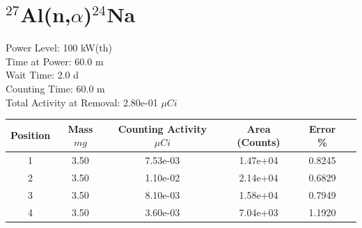 \newpage

\section*{ $^{27}$Al(n,$\alpha$)$^{24}$Na }

Power Level: 100 kW(th) \\
Time at Power: 60.0 m \\
Wait Time:  2.0 d \\
Counting Time: 60.0 m \\
Total Activity at Removal: 2.80e-01 $\mu Ci$

\begin{table}[h]
\centering
\begin{tabular}{ |c|c|c|c|c|c| }
 \hline
 Position & Mass $mg$ & Counting Activity $\mu Ci$ & Area (Counts) & Error \% \\
 \hline 
 1 & 3.50 & 7.53e-03 & 1.47e+04 & 0.8245 \\ 
\hline
 2 & 3.50 & 1.10e-02 & 2.14e+04 & 0.6829 \\ 
\hline
 3 & 3.50 & 8.10e-03 & 1.58e+04 & 0.7949 \\ 
\hline
 4 & 3.50 & 3.60e-03 & 7.04e+03 & 1.1920 \\ 
\hline
\end{tabular}
\end{table}

